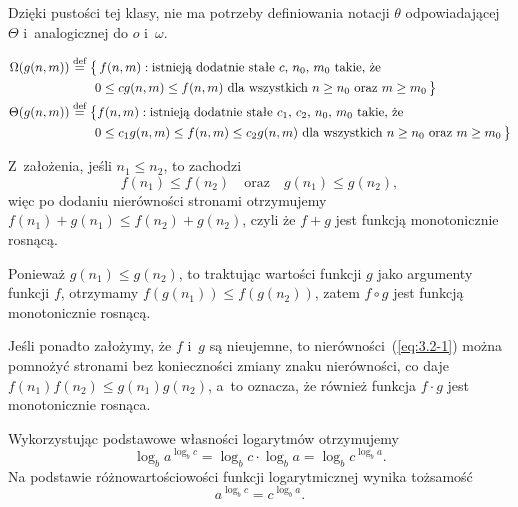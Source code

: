 Dzięki pustości tej klasy, nie ma potrzeby definiowania notacji $\theta$ odpowiadającej $\Theta$ i~analogicznej do $o$ i~$\omega$.

\exercise %
\[
	\begin{split}
		\Omega(g(n,m)) &\stackrel{\text{\scriptsize def}}{=} \bigl\{\,f(n,m):\text{istnieją dodatnie stałe $c$,~$n_0$,~$m_0$ takie, że} \\
		&\qquad 0 \le cg(n,m) \le f(n,m) \text{ dla wszystkich $n \ge n_0$ oraz $m \ge m_0$}\,\bigr\} \\%
		\Theta(g(n,m)) &\stackrel{\text{\scriptsize def}}{=} \bigl\{f(n,m):\text{istnieją dodatnie stałe $c_1$,~$c_2$,~$n_0$,~$m_0$ takie, że} \\
		&\qquad 0 \le c_1g(n,m) \le f(n,m) \le c_2g(n,m) \text{ dla wszystkich $n \ge n_0$ oraz $m \ge m_0$}\,\bigr\}
	\end{split}
\]


\exercise %
Z~założenia, jeśli $n_1\le n_2$, to zachodzi
\begin{equation}
	f(n_1) \le f(n_2) \quad\text{oraz}\quad g(n_1) \le g(n_2), \label{eq:3.2-1}
\end{equation}
więc po dodaniu nierówności stronami otrzymujemy $f(n_1)+g(n_1)\le f(n_2)+g(n_2)$, czyli że $f+g$ jest funkcją monotonicznie rosnącą.

Ponieważ $g(n_1)\le g(n_2)$, to traktując wartości funkcji $g$ jako argumenty funkcji $f$, otrzymamy $f(g(n_1))\le f(g(n_2))$, zatem $f\circ g$ jest funkcją monotonicznie rosnącą.

Jeśli ponadto założymy, że $f$ i~$g$ są nieujemne, to nierówności~(\ref{eq:3.2-1}) można pomnożyć stronami bez konieczności zmiany znaku nierówności, co daje $f(n_1)f(n_2)\le g(n_1)g(n_2)$, a~to oznacza, że również funkcja $f\cdot g$ jest monotonicznie rosnąca.

\exercise %
Wykorzystując podstawowe własności logarytmów otrzymujemy
\[
	\log_ba^{\log_bc} = \log_bc\cdot\log_ba = \log_bc^{\log_ba}.
\]
Na podstawie różnowartościowości funkcji logarytmicznej wynika tożsamość
\[
	a^{\log_bc} = c^{\log_ba}.
\]

